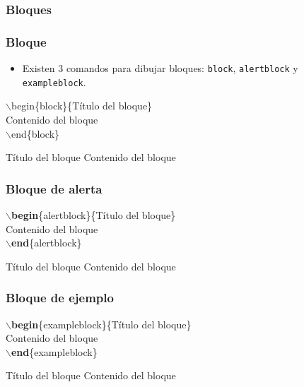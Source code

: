 \documentclass[aspectratio=1610]{beamer}%
\begin{document}
\subsubsection{Bloques}
\begin{frame}[fragile]
\frametitle{\textbf{Bloque}}
\justifying
 \begin{itemize}\justifying
  \item Existen 3 comandos para dibujar bloques: \texttt{block}, \texttt{alertblock} y \texttt{exampleblock}.
\end{itemize}

$\backslash$begin\{block\}\{Título del bloque\}\\
Contenido del bloque\\
$\backslash$end\{block\}

\begin{block}{Título del bloque}
Contenido del bloque
\end{block}


\end{frame}


\begin{frame}[fragile]
\frametitle{\textbf{Bloque de alerta}}
\justifying
 $\backslash$\textbf{begin}\{alertblock\}\{Título del bloque\}\\
Contenido del bloque\\
$\backslash$\textbf{end}\{alertblock\}

\begin{alertblock}{Título del bloque}
Contenido del bloque
\end{alertblock}

\end{frame}

\begin{frame}[fragile]
\frametitle{\textbf{Bloque de ejemplo}}
\justifying
 $\backslash$\textbf{begin}\{exampleblock\}\{Título del bloque\}\\
Contenido del bloque\\
$\backslash$\textbf{end}\{exampleblock\}

\begin{exampleblock}{Título del bloque}
Contenido del bloque
\end{exampleblock}

\end{frame}
\end{document}
